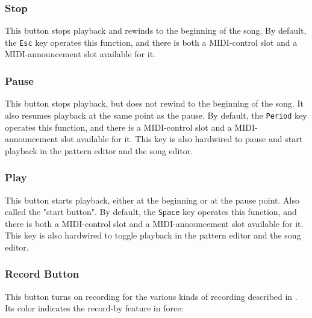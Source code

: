 \subsubsection{Stop}
\label{subsubsec:introduction_stop_button}

   This button stops playback and rewinds to the beginning of the song.
   By default, the \texttt{Esc} key operates this function,
   and there is both a MIDI-control slot and a MIDI-announcement slot
   available for it.

\subsubsection{Pause}
\label{subsubsec:introduction_pause_button}

   This button stops playback, but does not rewind to the beginning of the
   song.  It also resumes playback at the same point as the pause.  By default,
   the \texttt{Period} key operates this function, and there is a MIDI-control
   slot and a MIDI-announcement slot available for it.  This key is also
   hardwired to pause and start playback in the pattern editor and the song
   editor.

\subsubsection{Play}
\label{subsubsec:introduction_play_button}

   This button starts playback, either at the beginning or at the pause point.
   Also called the "start button".
   By default, the \texttt{Space} key operates this function,
   and there is both a MIDI-control slot and a MIDI-announcement slot
   available for it.
   This key is also hardwired to toggle playback in the pattern editor and the
   song editor.

\subsubsection{Record Button}
\label{subsubsec:introduction_record_button}

   This button turns on recording for the various kinds of recording
   described in .
   Its color indicates the record-by feature in force:

